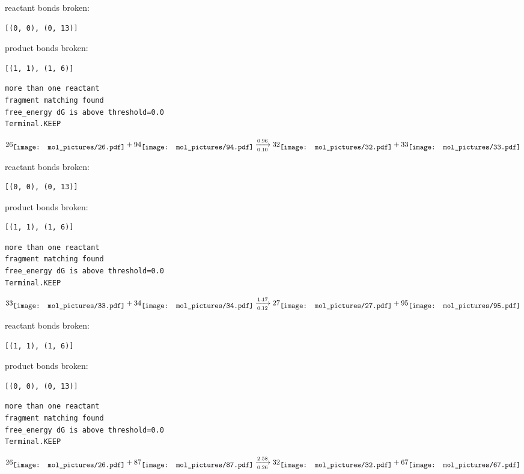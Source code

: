 \documentclass{article}
\begin{document}
reactant bonds broken:\begin{verbatim}
[(0, 0), (0, 13)]
\end{verbatim}
product bonds broken:\begin{verbatim}
[(1, 1), (1, 6)]
\end{verbatim}




\vspace{1cm}
\begin{verbatim}
more than one reactant
fragment matching found
free_energy dG is above threshold=0.0
Terminal.KEEP
\end{verbatim}
$$
26
\raisebox{-.5\height}{\texttt{[image: mol\_pictures/26.pdf]}}
+
94
\raisebox{-.5\height}{\texttt{[image: mol\_pictures/94.pdf]}}
\xrightarrow[0.10]{0.96}
32
\raisebox{-.5\height}{\texttt{[image: mol\_pictures/32.pdf]}}
+
33
\raisebox{-.5\height}{\texttt{[image: mol\_pictures/33.pdf]}}
$$


reactant bonds broken:\begin{verbatim}
[(0, 0), (0, 13)]
\end{verbatim}
product bonds broken:\begin{verbatim}
[(1, 1), (1, 6)]
\end{verbatim}




\vspace{1cm}
\begin{verbatim}
more than one reactant
fragment matching found
free_energy dG is above threshold=0.0
Terminal.KEEP
\end{verbatim}
$$
33
\raisebox{-.5\height}{\texttt{[image: mol\_pictures/33.pdf]}}
+
34
\raisebox{-.5\height}{\texttt{[image: mol\_pictures/34.pdf]}}
\xrightarrow[0.12]{1.17}
27
\raisebox{-.5\height}{\texttt{[image: mol\_pictures/27.pdf]}}
+
95
\raisebox{-.5\height}{\texttt{[image: mol\_pictures/95.pdf]}}
$$


reactant bonds broken:\begin{verbatim}
[(1, 1), (1, 6)]
\end{verbatim}
product bonds broken:\begin{verbatim}
[(0, 0), (0, 13)]
\end{verbatim}




\vspace{1cm}
\begin{verbatim}
more than one reactant
fragment matching found
free_energy dG is above threshold=0.0
Terminal.KEEP
\end{verbatim}
$$
26
\raisebox{-.5\height}{\texttt{[image: mol\_pictures/26.pdf]}}
+
87
\raisebox{-.5\height}{\texttt{[image: mol\_pictures/87.pdf]}}
\xrightarrow[0.26]{2.58}
32
\raisebox{-.5\height}{\texttt{[image: mol\_pictures/32.pdf]}}
+
67
\raisebox{-.5\height}{\texttt{[image: mol\_pictures/67.pdf]}}
$$
\end{document}
